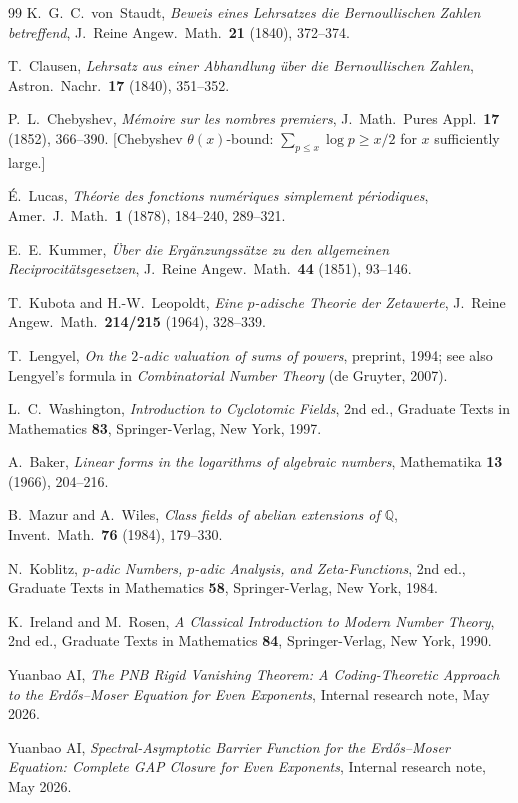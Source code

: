 \documentclass[12pt,a4paper]{article}
\theoremstyle{plain}
\theoremstyle{definition}
\newcommand{\Q}{\mathbb{Q}}
\begin{document}
\begin{thebibliography}{99}
K.~G.~C.~von~Staudt,
\textit{Beweis eines Lehrsatzes die Bernoullischen Zahlen betreffend},
J.\ Reine Angew.\ Math.\ \textbf{21} (1840), 372--374.

T.~Clausen,
\textit{Lehrsatz aus einer Abhandlung \"{u}ber die Bernoullischen Zahlen},
Astron.\ Nachr.\ \textbf{17} (1840), 351--352.

P.~L.~Chebyshev,
\textit{M\'{e}moire sur les nombres premiers},
J.\ Math.\ Pures Appl.\ \textbf{17} (1852), 366--390.
[Chebyshev $\theta(x)$-bound: $\sum_{p \le x} \log p \ge x/2$ for
$x$ sufficiently large.]

\'{E}.~Lucas,
\textit{Th\'{e}orie des fonctions num\'{e}riques simplement p\'{e}riodiques},
Amer.\ J.\ Math.\ \textbf{1} (1878), 184--240, 289--321.

E.~E.~Kummer,
\textit{\"{U}ber die Erg\"{a}nzungss\"{a}tze zu den allgemeinen
Reciprocit\"{a}tsgesetzen},
J.\ Reine Angew.\ Math.\ \textbf{44} (1851), 93--146.

T.~Kubota and H.-W.~Leopoldt,
\textit{Eine $p$-adische Theorie der Zetawerte},
J.\ Reine Angew.\ Math.\ \textbf{214/215} (1964), 328--339.

T.~Lengyel,
\textit{On the $2$-adic valuation of sums of powers},
preprint, 1994; see also Lengyel's formula in
\textit{Combinatorial Number Theory} (de Gruyter, 2007).

L.~C.~Washington,
\textit{Introduction to Cyclotomic Fields},
2nd ed., Graduate Texts in Mathematics \textbf{83},
Springer-Verlag, New York, 1997.

A.~Baker,
\textit{Linear forms in the logarithms of algebraic numbers},
Mathematika \textbf{13} (1966), 204--216.

B.~Mazur and A.~Wiles,
\textit{Class fields of abelian extensions of $\Q$},
Invent.\ Math.\ \textbf{76} (1984), 179--330.

N.~Koblitz,
\textit{$p$-adic Numbers, $p$-adic Analysis, and Zeta-Functions},
2nd ed., Graduate Texts in Mathematics \textbf{58},
Springer-Verlag, New York, 1984.

K.~Ireland and M.~Rosen,
\textit{A Classical Introduction to Modern Number Theory},
2nd ed., Graduate Texts in Mathematics \textbf{84},
Springer-Verlag, New York, 1990.

Yuanbao AI,
\textit{The PNB Rigid Vanishing Theorem: A Coding-Theoretic Approach to the
Erd\H{o}s--Moser Equation for Even Exponents},
Internal research note, May 2026.

Yuanbao AI,
\textit{Spectral-Asymptotic Barrier Function for the Erd\H{o}s--Moser Equation:
Complete GAP Closure for Even Exponents},
Internal research note, May 2026.

\end{thebibliography}

\end{document}
